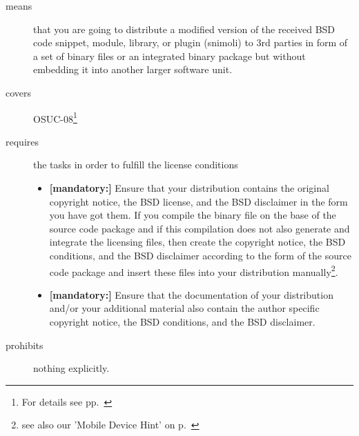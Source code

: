 \begin{description}
\item[means] that you are going to distribute a modified version of the received
BSD code snippet, module, library, or plugin (snimoli) to 3rd parties in form
of a set of binary files or an integrated binary package but without embedding
it into another larger software unit.
\item[covers] OSUC-08\footnote{For details see pp.\ \pageref{OSUC-08-DEF}}
\item[requires] the tasks in order to fulfill the license conditions
\begin{itemize}
   \item  \textbf{[mandatory:]} Ensure that your distribution contains the
  original copyright notice, the BSD license, and the BSD disclaimer in the form
  you have got them. If you compile the binary file on the base of the source
  code package and if this compilation does not also generate and integrate the
  licensing files, then create the copyright notice, the BSD conditions, and the
  BSD disclaimer according to the form of the source code package and insert
  these files into your distribution manually\footnote{see also our 'Mobile
  Device Hint' on p.\ \pageref{MobileDeviceHint}}.
  \item  \textbf{[mandatory:]} Ensure that the documentation of your
  distribution and/or your additional material also contain the author specific
  copyright notice, the BSD conditions, and the BSD disclaimer.
\end{itemize}
\item[prohibits] nothing explicitly.
\end{description}

